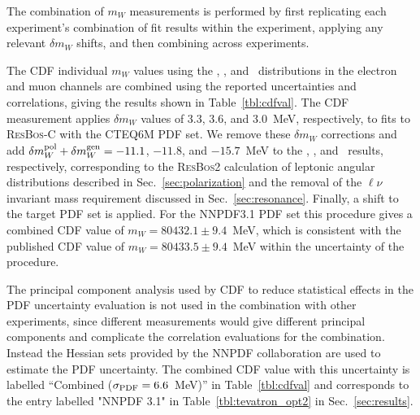 
The combination of $m_W$ measurements is performed by first replicating each experiment's 
combination of fit results within the experiment, applying any relevant $\delta m_W$ shifts, 
and then combining across experiments.

The CDF individual $m_W$ values using the \mT, \pTl, and \met~distributions in the electron 
and muon channels are combined using the reported uncertainties and correlations, giving the
results shown in Table~\ref{tbl:cdfval}.  The CDF measurement applies $\delta m_W$ values of
$3.3$, $3.6$, and $3.0$~MeV, respectively, to fits to {\textsc{ResBos-C}} with the CTEQ6M PDF
set.  We remove these $\delta m_W$ corrections and add 
$\delta m_W^{\scriptsize\textrm{pol}} + \delta m_W^{\scriptsize\textrm{gen}} = -11.1$,
$-11.8$, and $-15.7$~MeV to the \mT, \pTl, and \met~results, respectively,
corresponding to the {\textsc{ResBos2}} calculation of leptonic angular distributions described
in Sec.~\ref{sec:polarization} and the removal of the $\ell\nu$ invariant mass requirement
discussed in Sec.~\ref{sec:resonance}.  Finally, a shift to the target PDF set is applied.
For the NNPDF3.1 PDF set this procedure
gives a combined CDF value of $m_W = 80432.1 \pm 9.4$~MeV, which is consistent with the published
CDF value of $m_W = 80433.5 \pm 9.4$~MeV within the uncertainty of the procedure.  

The principal component analysis used by CDF to reduce statistical effects in the PDF uncertainty
evaluation is not used in the combination with other experiments, since different measurements 
would give different principal components and complicate the correlation evaluations for the
combination.  Instead the Hessian sets provided by the NNPDF collaboration are used to estimate
the PDF uncertainty.  The combined CDF value with this uncertainty is labelled
``Combined ($\sigma_{\scriptsize\textrm{PDF}} = 6.6$~MeV)'' in Table~\ref{tbl:cdfval} and
corresponds to the entry labelled "NNPDF 3.1" in Table~\ref{tbl:tevatron_opt2} in
Sec.~\ref{sec:results}.

